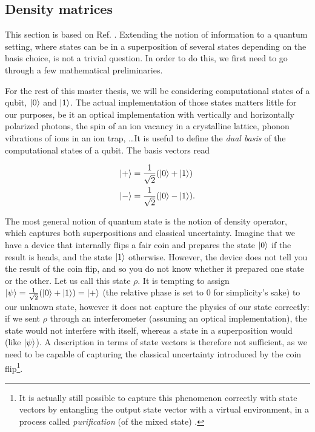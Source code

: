 


\subsection{Density matrices} \label{sec:density_matrices}

This section is based on Ref. \cite[pp. 98--108]{nielsen_quantum_2010}. Extending the notion of information to a quantum setting, where states can be in a superposition of several states depending on the basis choice, is not a trivial question. In order to do this, we first need to go through a few mathematical preliminaries. 

For the rest of this master thesis, we will be considering computational states of a qubit, $\ket{0}$ and $\ket{1}$. The actual implementation of those states matters little for our purposes, be it an optical implementation with vertically and horizontally polarized photons, the spin of an ion vacancy in a crystalline lattice, phonon vibrations of ions in an ion trap, \dots It is useful to define the \textit{dual basis} of the computational states of a qubit. The basis vectors read

\begin{align}
    \ket{+} &= \frac{1}{\sqrt{2}} (\ket{0} + \ket{1})\\
    \ket{-} &= \frac{1}{\sqrt{2}} (\ket{0} - \ket{1}).
\end{align}

The most general notion of quantum state is the notion of density operator, which captures both superpositions and classical uncertainty. Imagine that we have a device that internally flips a fair coin and prepares the state $\ket{0}$ if the result is heads, and the state $\ket{1}$ otherwise. However, the device does not tell you the result of the coin flip, and so you do not know whether it prepared one state or the other. Let us call this state $\rho$. It is tempting to assign $\ket{\psi} = \frac{1}{\sqrt{2}}(\ket{0} + \ket{1}) = \ket{+}$ (the relative phase is set to 0 for simplicity's sake) to our unknown state, however it does not capture the physics of our state correctly: if we sent $\rho$ through an interferometer (assuming an optical implementation), the state would not interfere with itself, whereas a state in a superposition would (like $\ket{\psi}$). A description in terms of state vectors is therefore not sufficient, as we need to be capable of capturing the classical uncertainty introduced by the coin flip\footnote{It is actually still possible to capture this phenomenon correctly with state vectors by entangling the output state vector with a virtual environment, in a process called \textit{purification} (of the mixed state) \cite[p. 110]{nielsen_quantum_2010}.}.


